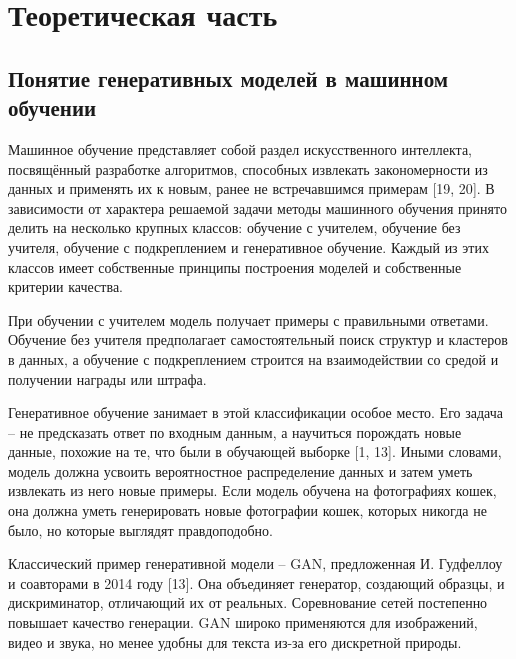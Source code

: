 \chapter{Теоретическая часть}\label{ux442ux435ux43eux440ux435ux442ux438ux447ux435ux441ux43aux430ux44f-ux447ux430ux441ux442ux44c}

\section{Понятие генеративных моделей в машинном обучении}\label{ux43fux43eux43dux44fux442ux438ux435-ux433ux435ux43dux435ux440ux430ux442ux438ux432ux43dux44bux445-ux43cux43eux434ux435ux43bux435ux439-ux432-ux43cux430ux448ux438ux43dux43dux43eux43c-ux43eux431ux443ux447ux435ux43dux438ux438}

Машинное обучение представляет собой раздел искусственного интеллекта, посвящённый разработке алгоритмов, способных извлекать закономерности из данных и применять их к новым, ранее не встречавшимся примерам {[}19, 20{]}. В зависимости от характера решаемой задачи методы машинного обучения принято делить на несколько крупных классов: обучение с учителем, обучение без учителя, обучение с подкреплением и генеративное обучение. Каждый из этих классов имеет собственные принципы построения моделей и собственные критерии качества.

При обучении с учителем модель получает примеры с правильными ответами. Обучение без учителя предполагает самостоятельный поиск структур и кластеров в данных, а обучение с подкреплением строится на взаимодействии со средой и получении награды или штрафа.

Генеративное обучение занимает в этой классификации особое место. Его задача -- не предсказать ответ по входным данным, а научиться порождать новые данные, похожие на те, что были в обучающей выборке {[}1, 13{]}. Иными словами, модель должна усвоить вероятностное распределение данных и затем уметь извлекать из него новые примеры. Если модель обучена на фотографиях кошек, она должна уметь генерировать новые фотографии кошек, которых никогда не было, но которые выглядят правдоподобно.

Классический пример генеративной модели -- GAN, предложенная И. Гудфеллоу и соавторами в 2014 году {[}13{]}. Она объединяет генератор, создающий образцы, и дискриминатор, отличающий их от реальных. Соревнование сетей постепенно повышает качество генерации. GAN широко применяются для изображений, видео и звука, но менее удобны для текста из-за его дискретной природы.

